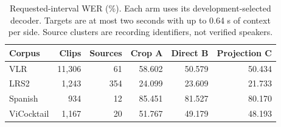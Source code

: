 \begin{table}[tb]
\centering\small
\caption{Requested-interval WER (\%). Each arm uses its development-selected decoder. Targets are at most two seconds with up to 0.64 s of context per side. Source clusters are recording identifiers, not verified speakers.}
\label{tab:primary}
\begin{tabular}{lrrrrr}
\toprule
Corpus & Clips & Sources & Crop A & Direct B & Projection C \\
\midrule
VLR & 11,306 & 61 & 58.602 & 50.579 & 50.434 \\
LRS2 & 1,243 & 354 & 24.099 & 23.609 & 21.733 \\
Spanish & 934 & 12 & 85.451 & 81.527 & 80.170 \\
ViCocktail & 1,167 & 20 & 51.767 & 49.179 & 48.193 \\
\bottomrule
\end{tabular}
\end{table}
